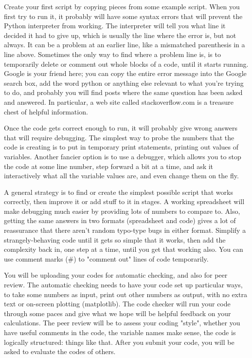 Create your first script by copying pieces from some example script. When you first try to run it, it probably will have some syntax errors that will prevent the Python interpreter from working. The interpreter will tell you what line it decided it had to give up, which is usually the line where the error is, but not always. It can be a problem at an earlier line, like a mismatched parenthesis in a line above. Sometimes the only way to find where a problem line is, is to temporarily delete or comment out whole blocks of a code, until it starts running. Google is your friend here; you can copy the entire error message into the Google search box, add the word python or anything else relevant to what you’re trying to do, and probably you will find posts where the same question has been asked and answered. In particular, a web site called stackoverflow.com is a treasure chest of helpful information.

Once the code gets correct enough to run, it will probably give wrong answers that will require debugging. The simplest way to probe the numbers that the code is creating is to put in temporary print statements, printing out values of variables. Another fancier option is to use a debugger, which allows you to stop the code at some line number, step forward a bit at a time, and ask it interactively what all the variable values are, and even change them on the fly.

A general strategy is to find or create the simplest possible script that works correctly, then improve it or add stuff to it in stages. A working spreadsheet will make debugging much easier by providing lots of numbers to compare to. Also, getting the same answers in two formats (spreadsheet and code) gives a lot of reassurance that there aren't random typo-type bugs in either format. Simplify a strangely-behaving code until it gets so simple that it works, then add the complexity back in, one step at a time, until you get that working also. You can use comment marks (\#) to "comment out" lines of code temporarily.

You will be uploading your codes for automatic checking, and also for peer review. The automatic checking needs to have your code set up particular ways, to take some numbers as input, print out other numbers as output, with no extra text or on-screen plotting (matplotlib). The code checker will run your code through some paces and give what we hope will be helpful feedback on your calculations. The peer review will be to assess your coding "style", whether you have useful comments in the code, the variable names make sense, the code is logically structured: things like that. After you submit your code, you will be asked to evaluate the codes of others.




